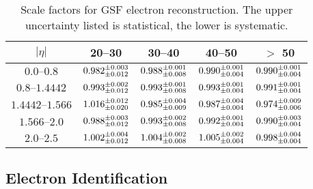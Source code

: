 \begin{table}[h]
\centering
\begin{center}
    \begin{tabular}{ | c | c | c | c | c |} \hline
	$|\eta|$                   & 20--30 \GeV                        & 30--40 \GeV                        & 40--50 \GeV                        & $>$ 50 \GeV                        \\ \hline
	$\numrange{0.0}{0.8}$      & $0.982^{\pm 0.003}_{\pm 0.012}$ & $0.988^{\pm 0.001}_{\pm 0.008}$ & $0.990^{\pm 0.001}_{\pm 0.004}$ & $0.990^{\pm 0.001}_{\pm 0.004}$ \\ \hline
	$\numrange{0.8}{1.4442}$   & $0.993^{\pm 0.002}_{\pm 0.012}$ & $0.993^{\pm 0.001}_{\pm 0.008}$ & $0.993^{\pm 0.001}_{\pm 0.004}$ & $0.991^{\pm 0.001}_{\pm 0.004}$ \\ \hline
	$\numrange{1.4442}{1.566}$ & $1.016^{\pm 0.012}_{\pm 0.020}$ & $0.985^{\pm 0.004}_{\pm 0.009}$ & $0.987^{\pm 0.004}_{\pm 0.004}$ & $0.974^{\pm 0.009}_{\pm 0.006}$ \\ \hline
	$\numrange{1.566}{2.0}$    & $0.988^{\pm 0.003}_{\pm 0.012}$ & $0.993^{\pm 0.002}_{\pm 0.008}$ & $0.992^{\pm 0.001}_{\pm 0.004}$ & $0.990^{\pm 0.003}_{\pm 0.004}$ \\ \hline
	$\numrange{2.0}{2.5}$      & $1.002^{\pm 0.004}_{\pm 0.012}$ & $1.004^{\pm 0.002}_{\pm 0.008}$ & $1.005^{\pm 0.002}_{\pm 0.004}$ & $0.998^{\pm 0.004}_{\pm 0.004}$ \\ \hline
    \end{tabular}
\end{center}
\caption{
    Scale factors for GSF electron reconstruction. The upper uncertainty listed
    is statistical, the lower is systematic.
}
\label{table:gsf_scale_factor}
\end{table}


\subsection{Electron Identification}

